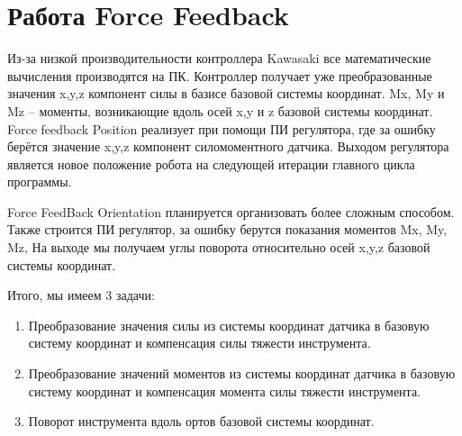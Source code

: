 \documentclass[a4paper,14pt,russian]{extreport} \usepackage{extsizes}
\begin{document}
	\section{Работа Force Feedback}
	
	Из-за низкой производительности контроллера Kawasaki все математические вычисления производятся на ПК. Контроллер получает уже преобразованные значения x,y,z компонент силы в базисе базовой системы координат. Mx, My и Mz – моменты, возникающие вдоль осей x,y и z базовой системы координат. Force feedback Position реализует при помощи ПИ регулятора, где за ошибку берётся значение x,y,z компонент силомоментного датчика. Выходом регулятора  является  новое положение робота на следующей итерации главного цикла программы.  
	
	Force FeedBack Orientation планируется организовать более сложным способом. Также строится ПИ регулятор, за ошибку берутся показания моментов Mx, My, Mz, На выходе мы получаем углы поворота относительно осей x,y,z базовой системы координат.
	
	Итого, мы имеем 3 задачи:
	\begin{enumerate}   
	\item{	Преобразование значения силы  из системы координат датчика в базовую систему координат и компенсация силы тяжести инструмента. }
	\item{	Преобразование значений моментов из системы координат датчика в базовую систему координат и компенсация момента силы тяжести инструмента.}
	\item{	Поворот инструмента вдоль ортов базовой системы координат.}
	\end{enumerate}   
	
\end{document}
